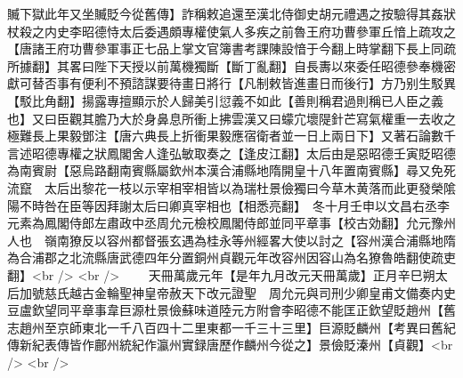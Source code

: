 贓下獄此年又坐贓貶今從舊傳】詐稱敕追還至漢北侍御史胡元禮遇之按驗得其姦狀杖殺之内史李昭德恃太后委遇頗專權使氣人多疾之前魯王府功曹參軍丘愔上疏攻之【唐諸王府功曹參軍事正七品上掌文官簿書考課陳設愔于今翻上時掌翻下長上同疏所據翻】其畧曰陛下天授以前萬機獨斷【斷丁亂翻】自長夀以來委任昭德參奉機密獻可替否事有便利不預諮謀要待畫日將行【凡制敕皆進畫日而後行】方乃别生駁異【駁比角翻】揚露專擅顯示於人歸美引愆義不如此【善則稱君過則稱已人臣之義也】又曰臣觀其膽乃大於身鼻息所衝上拂雲漢又曰蠓宂壞隄針芒寫氣權重一去收之極難長上果毅鄧注【唐六典長上折衝果毅應宿衛者並一日上兩日下】又著石論數千言述昭德專權之狀鳳閣舍人逢弘敏取奏之【逢皮江翻】太后由是惡昭德壬寅貶昭德為南賓尉【惡烏路翻南賓縣屬欽州本漢合浦縣地隋開皇十八年置南賓縣】尋又免死流竄　太后出黎花一枝以示宰相宰相皆以為瑞杜景儉獨曰今草木黄落而此更發榮隂陽不時咎在臣等因拜謝太后曰卿真宰相也【相悉亮翻】　冬十月壬申以文昌右丞李元素為鳳閣侍郎左肅政中丞周允元檢校鳳閣侍郎並同平章事【校古効翻】允元豫州人也　嶺南獠反以容州都督張玄遇為桂永等州經畧大使以討之【容州漢合浦縣地隋為合浦郡之北流縣唐武德四年分置銅州貞觀元年改容州因容山為名獠魯皓翻使疏吏翻】<br />
<br />
　　天冊萬歲元年【是年九月改元天冊萬歲】正月辛巳朔太后加號慈氏越古金輪聖神皇帝赦天下改元證聖　周允元與司刑少卿皇甫文備奏内史豆盧欽望同平章事韋巨源杜景儉蘇味道陸元方附會李昭德不能匡正欽望貶趙州【舊志趙州至京師東北一千八百四十二里東都一千三十三里】巨源貶麟州【考異曰舊紀傳新紀表傳皆作鄜州統紀作瀛州實録唐歷作麟州今從之】景儉貶溱州【貞觀】<br />
<br />

